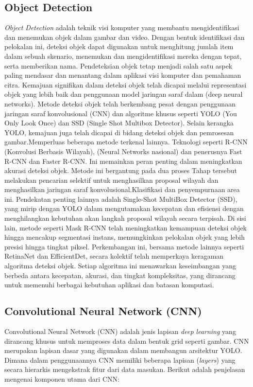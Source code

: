 \subsection{Object Detection}
\emph{Object Detection} adalah teknik visi komputer yang membantu mengidentifikasi dan menemukan objek dalam gambar dan video. Dengan bentuk identifikasi dan pelokalan ini, deteksi objek dapat digunakan untuk menghitung jumlah item dalam sebuah skenario, menemukan dan mengidentifikasi mereka dengan tepat, serta memberikan nama. Pendeteksian objek tetap menjadi salah satu aspek paling mendasar dan menantang dalam aplikasi visi komputer dan pemahaman citra. Kemajuan signifikan dalam deteksi objek telah dicapai melalui representasi objek yang lebih baik dan penggunaan model jaringan saraf dalam (deep neural networks). Metode deteksi objek telah berkembang pesat dengan penggunaan jaringan saraf konvolusional (CNN) dan algoritme khusus seperti YOLO (You Only Look Once) dan SSD (Single Shot Multibox Detector).
Selain kerangka YOLO, kemajuan juga telah dicapai di bidang deteksi objek dan pemrosesan gambar.Memperluas beberapa metode terkenal lainnya. Teknologi seperti R-CNN (Konvolusi Berbasis Wilayah), (Neural Networks nasional) dan penerusnya Fast R-CNN dan Faster R-CNN.
Ini memainkan peran penting dalam meningkatkan akurasi deteksi objek. Metode ini bergantung pada dua proses Tahap tersebut melakukan pencarian selektif untuk menghasilkan proposal wilayah dan menghasilkan jaringan saraf konvolusional.Klasifikasi dan penyempurnaan area ini. Pendekatan penting lainnya adalah Single-Shot MultiBox Detector (SSD), yang mirip dengan YOLO dalam mengutamakan kecepatan dan efisiensi dengan menghilangkan kebutuhan akan langkah proposal wilayah secara terpisah. Di sisi lain, metode seperti Mask R-CNN telah meningkatkan kemampuan deteksi objek hingga mencakup segmentasi instans, memungkinkan pelokalan objek yang lebih presisi hingga tingkat piksel. Perkembangan ini, bersama metode lainnya seperti RetinaNet dan EfficientDet, secara kolektif telah memperkaya keragaman algoritma deteksi objek. Setiap algoritma ini menawarkan keseimbangan yang berbeda antara kecepatan, akurasi, dan tingkat kompleksitas, yang dirancang untuk memenuhi berbagai kebutuhan aplikasi dan batasan komputasi.

\subsection{Convolutional Neural Network (CNN)}

Convolutional Neural Network (CNN) adalah jenis lapisan \emph{deep learning} yang dirancang khusus untuk memproses data dalam bentuk grid seperti gambar. CNN merupakan lapisan dasar yang digunakan dalam membangun arsitektur YOLO. Dimana dalam penggunaannya CNN memiliki beberapa lapisan (\emph{layers}) yang secara hierarkis mengekstrak fitur dari data masukan. Berikut adalah penjelasan mengenai komponen utama dari CNN:

